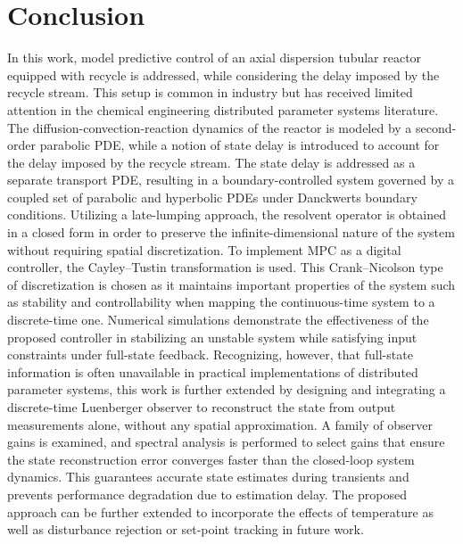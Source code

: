 \section{Conclusion} \label{sec:2_conclusion}

In this work, model predictive control of an axial dispersion tubular reactor equipped with recycle is addressed, while considering the delay imposed by the recycle stream. This setup is common in industry but has received limited attention in the chemical engineering distributed parameter systems literature. The diffusion-convection-reaction dynamics of the reactor is modeled by a second-order parabolic PDE, while a notion of state delay is introduced to account for the delay imposed by the recycle stream. The state delay is addressed as a separate transport PDE, resulting in a boundary-controlled system governed by a coupled set of parabolic and hyperbolic PDEs under Danckwerts boundary conditions. Utilizing a late-lumping approach, the resolvent operator is obtained in a closed form in order to preserve the infinite-dimensional nature of the system without requiring spatial discretization. To implement MPC as a digital controller, the Cayley–Tustin transformation is used. This Crank–Nicolson type of discretization is chosen as it maintains important properties of the system such as stability and controllability when mapping the continuous-time system to a discrete-time one. Numerical simulations demonstrate the effectiveness of the proposed controller in stabilizing an unstable system while satisfying input constraints under full-state feedback. Recognizing, however, that full-state information is often unavailable in practical implementations of distributed parameter systems, this work is further extended by designing and integrating a discrete-time Luenberger observer to reconstruct the state from output measurements alone, without any spatial approximation. A family of observer gains is examined, and spectral analysis is performed to select gains that ensure the state reconstruction error converges faster than the closed-loop system dynamics. This guarantees accurate state estimates during transients and prevents performance degradation due to estimation delay. The proposed approach can be further extended to incorporate the effects of temperature as well as disturbance rejection or set-point tracking in future work.